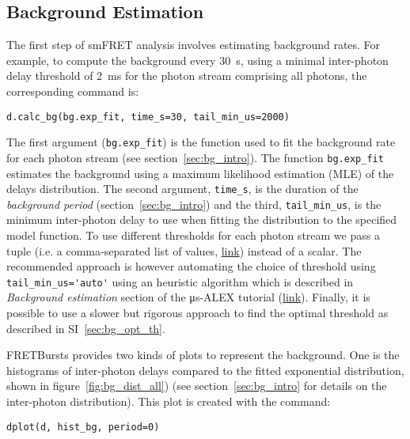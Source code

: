 \subsection{Background Estimation}
\label{sec:bg_calc}

The first step of smFRET analysis involves estimating background rates.
For example, to compute the background every 30~s, using a minimal inter-photon
delay threshold of 2~ms for the photon stream comprising all photons, the corresponding command is:

\begin{lstlisting}
d.calc_bg(bg.exp_fit, time_s=30, tail_min_us=2000)
\end{lstlisting}

The first argument (\verb|bg.exp_fit|) is the function used to fit the
background rate for each photon stream (see section~\ref{sec:bg_intro}).
The function
\verb|bg.exp_fit| estimates the background using a maximum likelihood estimation
(MLE) of the delays distribution.
The second argument, \verb|time_s|, is the duration of the
\textit{background period} (section~\ref{sec:bg_intro}) and the third, \verb|tail_min_us|,
is the minimum inter-photon delay to use when fitting the distribution to the specified model function.
To use different thresholds for each photon stream we pass a
tuple (i.e. a comma-separated list of values, \href{https://docs.python.org/3.5/tutorial/datastructures.html#tuples-and-sequences}{link}) instead of a scalar.
The recommended approach is however automating the choice of threshold using
\verb|tail_min_us='auto'| using an heuristic algorithm which is described in 
\textit{Background estimation} section of the μs-ALEX tutorial 
(\href{http://nbviewer.jupyter.org/github/tritemio/FRETBursts_notebooks/blob/master/notebooks/FRETBursts%20-%20us-ALEX%20smFRET%20burst%20analysis.ipynb#Background-estimation}{link}).
Finally, it is possible to use a slower but rigorous approach to find the optimal
threshold as described in SI~\ref{sec:bg_opt_th}.

FRETBursts provides two kinds of plots to represent the background. One is the histograms
of inter-photon delays compared to the fitted exponential distribution, shown in 
figure~\ref{fig:bg_dist_all}) (see section~\ref{sec:bg_intro} for details on the inter-photon distribution). 
This plot is created with the command:

\begin{lstlisting}
dplot(d, hist_bg, period=0)
\end{lstlisting}

